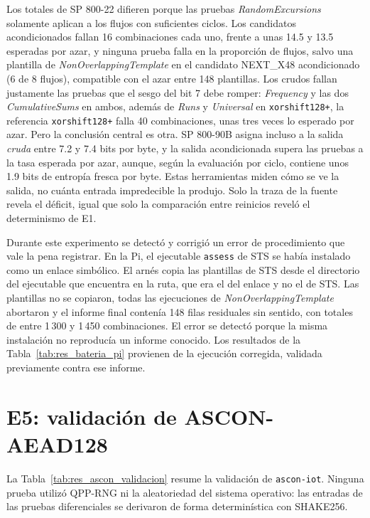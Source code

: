 Los totales de SP 800-22 difieren porque las pruebas \textit{RandomExcursions} solamente aplican a los flujos con suficientes ciclos. Los candidatos acondicionados fallan 16 combinaciones cada uno, frente a unas 14.5 y 13.5 esperadas por azar, y ninguna prueba falla en la proporción de flujos, salvo una plantilla de \textit{NonOverlappingTemplate} en el candidato NEXT\_X48 acondicionado (6 de 8 flujos), compatible con el azar entre 148 plantillas. Los crudos fallan justamente las pruebas que el sesgo del bit 7 debe romper: \textit{Frequency} y las dos \textit{CumulativeSums} en ambos, además de \textit{Runs} y \textit{Universal} en \texttt{xorshift128+}, la referencia \texttt{xorshift128+} falla 40 combinaciones, unas tres veces lo esperado por azar. Pero la conclusión central es otra. SP 800-90B asigna incluso a la salida \emph{cruda} entre 7.2 y 7.4 bits por byte, y la salida acondicionada supera las pruebas a la tasa esperada por azar, aunque, según la evaluación por ciclo, contiene unos 1.9 bits de entropía fresca por byte. Estas herramientas miden cómo se ve la salida, no cuánta entrada impredecible la produjo. Solo la traza de la fuente revela el déficit, igual que solo la comparación entre reinicios reveló el determinismo de E1.

Durante este experimento se detectó y corrigió un error de procedimiento que vale la pena registrar. En la Pi, el ejecutable \texttt{assess} de STS se había instalado como un enlace simbólico. El arnés copia las plantillas de STS desde el directorio del ejecutable que encuentra en la ruta, que era el del enlace y no el de STS. Las plantillas no se copiaron, todas las ejecuciones de \textit{NonOverlappingTemplate} abortaron y el informe final contenía 148 filas residuales sin sentido, con totales de entre 1\,300 y 1\,450 combinaciones. El error se detectó porque la misma instalación no reproducía un informe conocido. Los resultados de la Tabla~\ref{tab:res_bateria_pi} provienen de la ejecución corregida, validada previamente contra ese informe.

\section{E5: validación de ASCON-AEAD128}
\label{sec:res_ascon}

La Tabla~\ref{tab:res_ascon_validacion} resume la validación de \texttt{ascon-iot}. Ninguna prueba utilizó QPP-RNG ni la aleatoriedad del sistema operativo: las entradas de las pruebas diferenciales se derivaron de forma determinística con SHAKE256.

